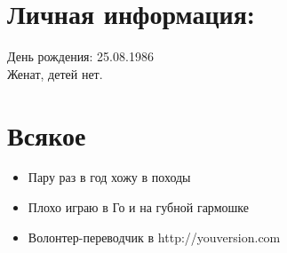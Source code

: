\documentclass[margin]{res} %
\begin{document}
\begin{resume}
\section{Личная информация:}
День рождения: 25.08.1986\\
Женат, детей нет. 

\section{Всякое} 
\begin{itemize}
\item Пару раз в год хожу в походы
\item Плохо играю в Го и на губной гармошке
\item Волонтер-переводчик в http://youversion.com
\end{itemize}

\end{resume}
\end{document}

